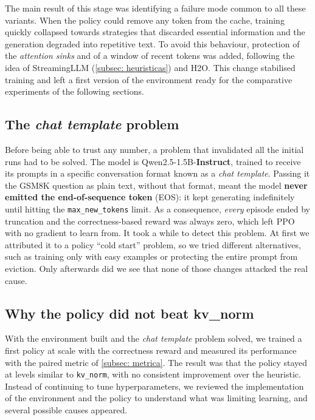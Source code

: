 The main result of this stage was identifying a failure mode common to all these variants. When the policy could remove any token from the cache, training quickly collapsed towards strategies that discarded essential information and the generation degraded into repetitive text. To avoid this behaviour, protection of the \textit{attention sinks} and of a window of recent tokens was added, following the idea of StreamingLLM (\cref{subsec: heuristicas}) and H2O. This change stabilised training and left a first version of the environment ready for the comparative experiments of the following sections.


\subsection{The \textit{chat template} problem} \label{subsec: chattemplate}

Before being able to trust any number, a problem that invalidated all the initial runs had to be solved. The model is Qwen2.5-1.5B-\textbf{Instruct}, trained to receive its prompts in a specific conversation format known as a \textit{chat template}. Passing it the GSM8K question as plain text, without that format, meant the model
\textbf{never emitted the end-of-sequence token} (EOS): it kept generating indefinitely until hitting the \texttt{max\_new\_tokens} limit. As a consequence, \emph{every} episode ended by truncation and the correctness-based reward was always zero, which left PPO with no gradient to learn from. It took a while to detect this problem. At first we attributed it to a policy ``cold start'' problem, so we tried different alternatives, such as training only with easy examples or protecting the entire prompt from eviction. Only afterwards did we see that none of those changes attacked the real cause.




\subsection{Why the policy did not beat kv\_norm} \label{subsec: d1d4}


With the environment built and the \textit{chat template} problem solved,
we trained a first policy at scale with the correctness reward and measured its performance with the paired metric of \cref{subsec: metrica}. The result was that the policy stayed at levels similar to \texttt{kv\_norm}, with no consistent improvement over the heuristic. Instead of continuing to tune hyperparameters, we reviewed the implementation of the environment and the policy to understand what was limiting learning, and several possible causes appeared.

